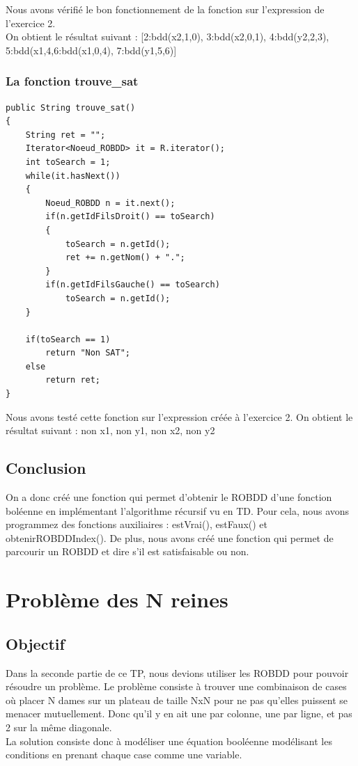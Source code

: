 \documentclass{article}
\begin{document}
Nous avons vérifié le bon fonctionnement de la fonction sur l'expression de l'exercice 2.\\
On obtient le résultat suivant : [2:bdd(x2,1,0), 3:bdd(x2,0,1), 4:bdd(y2,2,3), 5:bdd(x1,4,6:bdd(x1,0,4), 7:bdd(y1,5,6)]
\subsubsection{La fonction trouve\_sat}
\begin{verbatim}
public String trouve_sat()
{
	String ret = "";
	Iterator<Noeud_ROBDD> it = R.iterator();
	int toSearch = 1;
	while(it.hasNext())
	{
		Noeud_ROBDD n = it.next();
		if(n.getIdFilsDroit() == toSearch)
		{
			toSearch = n.getId();
			ret += n.getNom() + ".";
		}
		if(n.getIdFilsGauche() == toSearch)
			toSearch = n.getId();
	}
	
	if(toSearch == 1)
		return "Non SAT";
	else
		return ret;
}
\end{verbatim}
Nous avons testé cette fonction sur l'expression créée à l'exercice 2.
On obtient le résultat suivant : non x1, non y1, non x2, non y2
\subsection{Conclusion}
On a donc créé une fonction qui permet d'obtenir le ROBDD d'une fonction boléenne en implémentant l'algorithme récursif vu en TD. Pour cela, nous avons programmez des fonctions auxiliaires : estVrai(), estFaux() et obtenirROBDDIndex(). De plus, nous avons créé une fonction qui permet de parcourir un ROBDD et dire s'il est satisfaisable ou non.
\section{Problème des N reines}
\subsection{Objectif}
Dans la seconde partie de ce TP, nous devions utiliser les ROBDD pour pouvoir résoudre un problème. Le problème consiste à trouver une combinaison de cases où placer N dames sur un plateau de taille NxN pour ne pas qu'elles puissent se menacer mutuellement. Donc qu'il y en ait une par colonne, une par ligne, et pas 2 sur la même diagonale.\\
La solution consiste donc à modéliser une équation booléenne modélisant les conditions en prenant chaque case comme une variable.
\end{document}
